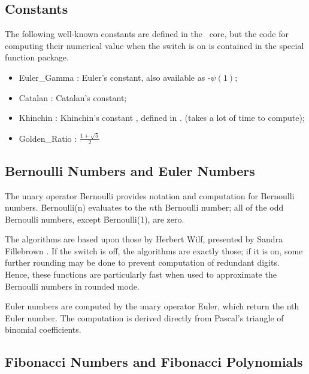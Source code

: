 \subsection{Constants}

The following well-known constants are defined in the \REDUCE\ core, but the code for 
computing their numerical value when the switch  is on is contained in
the special function package.
\begin{itemize}
\item Euler\_Gamma : Euler's constant, also available as -$\psi(1)$;
\item Catalan : Catalan's constant;
\item Khinchin : Khinchin's constant , defined in  \cite{Khinchin:64}.
 (takes a lot of time to compute);
\item Golden\_Ratio : $\displaystyle\frac{1 + \sqrt{5}}{2}$ 
\end{itemize}


\subsection{Bernoulli Numbers and Euler Numbers}

The unary operator \f{Bernoulli} provides notation and computation for
Bernoulli numbers.  \f{Bernoulli(n)} evaluates to the $n$th Bernoulli
number; all of the odd Bernoulli numbers, except \f{Bernoulli(1)}, are
zero.

The algorithms are based upon those by Herbert Wilf, presented by Sandra
Fillebrown \cite{Fillebrown:92}.  If the  switch is off,
the algorithms are exactly those; if it is on, some further rounding may
be done to prevent computation of redundant digits.  Hence, these
functions are particularly fast when used to approximate the Bernoulli
numbers in rounded mode.

Euler numbers are computed by the unary operator Euler, which
return the nth Euler number. The computation is derived 
directly from Pascal's triangle of binomial coefficients.
 

\subsection{Fibonacci Numbers and Fibonacci Polynomials}

